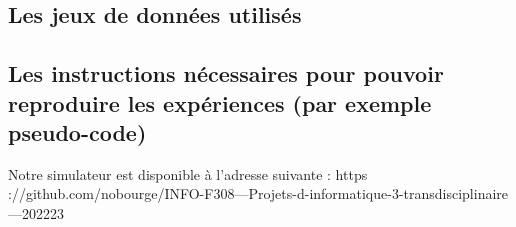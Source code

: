 \documentclass[journal, a4paper]{IEEEtran}
\begin{document}
	\subsection{Les jeux de données utilisés}
	\subsection{Les instructions nécessaires pour pouvoir reproduire les expériences (par exemple pseudo-code)}
	Notre  simulateur  est  disponible  à  l’adresse  suivante  : https
	://github.com/nobourge/INFO-F308---Projets-d-informatique-3-transdisciplinaire---202223
\end{document}
